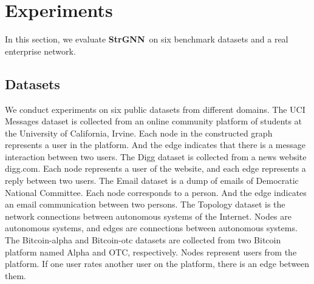 \documentclass{article}
\newcommand{\model}{\textbf{StrGNN}~}
\begin{document}
\section{Experiments}
In this section, we evaluate \model on six benchmark datasets and a real enterprise network.

\subsection{Datasets}
We conduct experiments on six public datasets from different domains. %
The UCI Messages dataset \cite{opsahl2009clustering} is collected from an online community platform of students at the University of California, Irvine. Each node in the constructed graph represents a user in the platform. And the edge indicates that there is a message interaction between two users. The Digg dataset \cite{de2009social} is collected from a news website digg.com. Each node represents a user of the website, and each edge represents a reply between two users. The Email dataset is a dump of emails of Democratic National Committee. Each node corresponds to a person. And the edge indicates an email communication between two persons. The Topology \cite{zhang2005collecting} dataset is the network connections between autonomous systems of the Internet. Nodes are autonomous systems, and edges are connections between autonomous systems. The Bitcoin-alpha and Bitcoin-otc \cite{kumar2016edge,kumar2018rev2} datasets are collected from two Bitcoin platform named Alpha and OTC, respectively. Nodes represent users from the platform. If one user rates another user on the platform, there is an edge between them.
\end{document}
